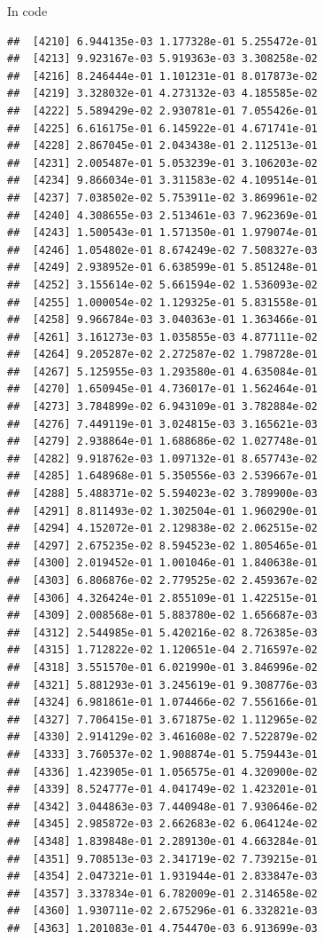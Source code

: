 \documentclass[ignorenonframetext,]{beamer}
\begin{document}
\begin{frame}[fragile]{In code}
\begin{verbatim}
##  [4210] 6.944135e-03 1.177328e-01 5.255472e-01
##  [4213] 9.923167e-03 5.919363e-03 3.308258e-02
##  [4216] 8.246444e-01 1.101231e-01 8.017873e-02
##  [4219] 3.328032e-01 4.273132e-03 4.185585e-02
##  [4222] 5.589429e-02 2.930781e-01 7.055426e-01
##  [4225] 6.616175e-01 6.145922e-01 4.671741e-01
##  [4228] 2.867045e-01 2.043438e-01 2.112513e-01
##  [4231] 2.005487e-01 5.053239e-01 3.106203e-02
##  [4234] 9.866034e-01 3.311583e-02 4.109514e-01
##  [4237] 7.038502e-02 5.753911e-02 3.869961e-02
##  [4240] 4.308655e-03 2.513461e-03 7.962369e-01
##  [4243] 1.500543e-01 1.571350e-01 1.979074e-01
##  [4246] 1.054802e-01 8.674249e-02 7.508327e-03
##  [4249] 2.938952e-01 6.638599e-01 5.851248e-01
##  [4252] 3.155614e-02 5.661594e-02 1.536093e-02
##  [4255] 1.000054e-02 1.129325e-01 5.831558e-01
##  [4258] 9.966784e-03 3.040363e-01 1.363466e-01
##  [4261] 3.161273e-03 1.035855e-03 4.877111e-02
##  [4264] 9.205287e-02 2.272587e-02 1.798728e-01
##  [4267] 5.125955e-03 1.293580e-01 4.635084e-01
##  [4270] 1.650945e-01 4.736017e-01 1.562464e-01
##  [4273] 3.784899e-02 6.943109e-01 3.782884e-02
##  [4276] 7.449119e-01 3.024815e-03 3.165621e-03
##  [4279] 2.938864e-01 1.688686e-02 1.027748e-01
##  [4282] 9.918762e-03 1.097132e-01 8.657743e-02
##  [4285] 1.648968e-01 5.350556e-03 2.539667e-01
##  [4288] 5.488371e-02 5.594023e-02 3.789900e-03
##  [4291] 8.811493e-02 1.302504e-01 1.960290e-01
##  [4294] 4.152072e-01 2.129838e-02 2.062515e-02
##  [4297] 2.675235e-02 8.594523e-02 1.805465e-01
##  [4300] 2.019452e-01 1.001046e-01 1.840638e-01
##  [4303] 6.806876e-02 2.779525e-02 2.459367e-02
##  [4306] 4.326424e-01 2.855109e-01 1.422515e-01
##  [4309] 2.008568e-01 5.883780e-02 1.656687e-03
##  [4312] 2.544985e-01 5.420216e-02 8.726385e-03
##  [4315] 1.712822e-02 1.120651e-04 2.716597e-02
##  [4318] 3.551570e-01 6.021990e-01 3.846996e-02
##  [4321] 5.881293e-01 3.245619e-01 9.308776e-03
##  [4324] 6.981861e-01 1.074466e-02 7.556166e-01
##  [4327] 7.706415e-01 3.671875e-02 1.112965e-02
##  [4330] 2.914129e-02 3.461608e-02 7.522879e-02
##  [4333] 3.760537e-02 1.908874e-01 5.759443e-01
##  [4336] 1.423905e-01 1.056575e-01 4.320900e-02
##  [4339] 8.524777e-01 4.041749e-02 1.423201e-01
##  [4342] 3.044863e-03 7.440948e-01 7.930646e-02
##  [4345] 2.985872e-03 2.662683e-02 6.064124e-02
##  [4348] 1.839848e-01 2.289130e-01 4.663284e-01
##  [4351] 9.708513e-03 2.341719e-02 7.739215e-01
##  [4354] 2.047321e-01 1.931944e-01 2.833847e-03
##  [4357] 3.337834e-01 6.782009e-01 2.314658e-02
##  [4360] 1.930711e-02 2.675296e-01 6.332821e-03
##  [4363] 1.201083e-01 4.754470e-03 6.913699e-03

\end{verbatim}
\end{frame}
\end{document}
